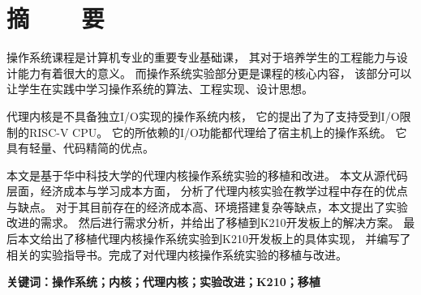 %
%
%
%
%

\vspace*{-11mm}

\begin{center}
  \heiti{}\textbf{\thesisTitle}
\end{center}

\vspace*{2mm}

{\let\clearpage\relax \chapter*{\textmd{摘~~~~要}}}
\setcounter{page}{1}

\vspace*{1mm}

\setlength{\parskip}{0em}

操作系统课程是计算机专业的重要专业基础课，
其对于培养学生的工程能力与设计能力有着很大的意义。
而操作系统实验部分更是课程的核心内容，
该部分可以让学生在实践中学习操作系统的算法、工程实现、设计思想。

代理内核是不具备独立I/O实现的操作系统内核，
它的提出了为了支持受到I/O限制的RISC-V CPU。
它的所依赖的I/O功能都代理给了宿主机上的操作系统。
它具有轻量、代码精简的优点。

本文是基于华中科技大学的代理内核操作系统实验的移植和改进。
本文从源代码层面，经济成本与学习成本方面，
分析了代理内核实验在教学过程中存在的优点与缺点。
对于其目前存在的经济成本高、环境搭建复杂等缺点，本文提出了实验改进的需求。
然后进行需求分析，并给出了移植到K210开发板上的解决方案。
最后本文给出了移植代理内核操作系统实验到K210开发板上的具体实现，
并编写了相关的实验指导书。完成了对代理内核操作系统实验的移植与改进。

\vspace{4ex}\noindent\textbf{\heiti 关键词：操作系统；内核；代理内核；实验改进；K210；移植}
\newpage

